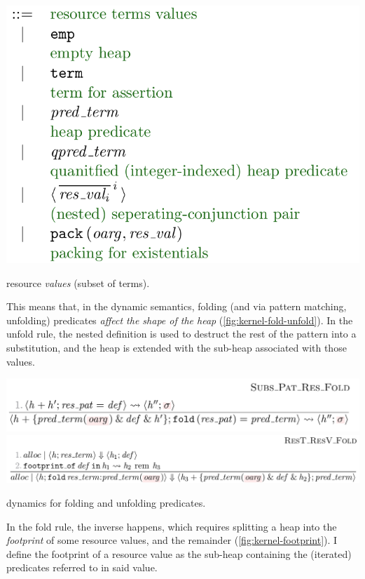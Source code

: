 \begin{marginfigure}
    \includegraphics{figures/kernel-dynamics-res-val}
    \caption{ resource \emph{values} (subset of terms).}\label{fig:kernel-res-val-def}
\end{marginfigure}

This means that, in the dynamic semantics, folding (and via pattern matching,
unfolding) predicates \emph{affect the shape of the heap}
(\cref{fig:kernel-fold-unfold}). In the unfold rule, the nested definition is
used to destruct the rest of the pattern into a substitution, and the heap is
extended with the sub-heap associated with those values.

\begin{marginfigure}
    \includegraphics{figures/kernel-dynamics-unfold}
    \includegraphics{figures/kernel-dynamics-fold}
    \caption{ dynamics for folding and unfolding
        predicates.}\label{fig:kernel-fold-unfold}
\end{marginfigure}

In the fold rule, the inverse happens, which requires splitting a heap into the
\emph{footprint} of some resource values, and the remainder
(\cref{fig:kernel-footprint}). I define the footprint of a resource value as
the sub-heap containing the (iterated) predicates referred to in said value.

